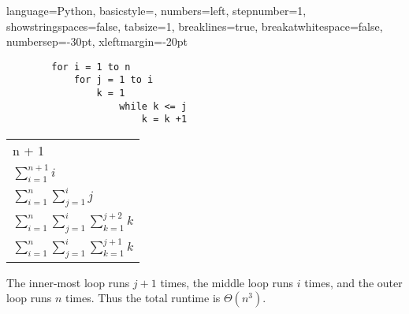 \documentclass{article}
\begin{document}
\begin{enumerate}
          { %
              language=Python,
              basicstyle=\footnotesize,
              numbers=left,
              stepnumber=1,
              showstringspaces=false,
              tabsize=1,
              breaklines=true,
              breakatwhitespace=false,
              numbersep=-30pt,
              xleftmargin=-20pt
          }
          \setlength{\columnseprule}{0.1pt}
          \begin{multicols}{2}
              \begin{lstlisting}
        for i = 1 to n
            for j = 1 to i
                k = 1
                    while k <= j
                        k = k +1
        \end{lstlisting}
              \columnbreak
              \footnotesize
              \begin{tabular}{l}
                  n + 1                                                   \\
                  $\sum_{i=1}^{n+1}{i}$                                   \\
                  $\sum_{i=1}^{n}{\sum_{j=1}^{i}{j}}$                     \\
                  $\sum_{i=1}^{n}{\sum_{j=1}^{i}{\sum_{k=1}^{j + 2}{k}}}$ \\
                  $\sum_{i=1}^{n}{\sum_{j=1}^{i}{\sum_{k=1}^{j + 1}{k}}}$
              \end{tabular}
          \end{multicols}
          The inner-most loop runs \(j + 1\) times, the middle loop runs \(i\) times, and the outer loop runs \(n\) times. Thus the total runtime is \(\Theta(n^3)\).
\end{enumerate}
\end{document}
